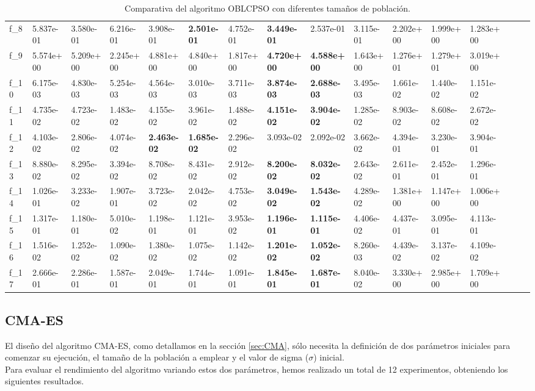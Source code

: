 \begin{table}[!ht]
{\begin{tabular}{LLLLLLLLLLLLLLLL}
f_{8} & 5.837e-01 & 3.580e-01 & 6.216e-01 & 3.908e-01 & {\bf 2.501e-01} & 4.752e-01 & {\bf 3.449e-01} & 2.537e-01 & 3.115e-01 & 2.202e+00 & 1.999e+00 & 1.283e+00 \\
f_{9} & 5.574e+00 & 5.209e+00 & 2.245e+00 & 4.881e+00 & 4.840e+00 & 1.817e+00 & {\bf 4.720e+00} & {\bf 4.588e+00} & 1.643e+00 & 1.276e+01 & 1.279e+01 & 3.019e+00 \\
f_{10} & 6.175e-03 & 4.830e-03 & 5.254e-03 & 4.564e-03 & 3.010e-03 & 3.711e-03 & {\bf 3.874e-03} & {\bf 2.688e-03} & 3.495e-03 & 1.661e-02 & 1.440e-02 & 1.151e-02 \\
f_{11} & 4.735e-02 & 4.723e-02 & 1.483e-02 & 4.155e-02 & 3.961e-02 & 1.488e-02 & {\bf 4.151e-02} & {\bf 3.904e-02} & 1.285e-02 & 8.903e-02 & 8.608e-02 & 2.672e-02 \\
f_{12} & 4.103e-02 & 2.806e-02 & 4.074e-02 & {\bf 2.463e-02} & {\bf 1.685e-02} & 2.296e-02 & 3.093e-02 & 2.092e-02 & 3.662e-02 & 4.394e-01 & 3.230e-01 & 3.904e-01 \\
f_{13} & 8.880e-02 & 8.295e-02 & 3.394e-02 & 8.708e-02 & 8.431e-02 & 2.912e-02 & {\bf 8.200e-02} & {\bf 8.032e-02} & 2.643e-02 & 2.611e-01 & 2.452e-01 & 1.296e-01 \\
f_{14} & 1.026e-01 & 3.233e-02 & 1.907e-01 & 3.723e-02 & 2.042e-02 & 4.753e-02 & {\bf 3.049e-02} & {\bf 1.543e-02} & 4.289e-02 & 1.381e+00 & 1.147e+00 & 1.006e+00 \\
f_{15} & 1.317e-01 & 1.180e-01 & 5.010e-02 & 1.198e-01 & 1.121e-01 & 3.953e-02 & {\bf 1.196e-01} & {\bf 1.115e-01} & 4.406e-02 & 4.437e-01 & 3.095e-01 & 4.113e-01 \\
f_{16} & 1.516e-02 & 1.252e-02 & 1.090e-02 & 1.380e-02 & 1.075e-02 & 1.142e-02 & {\bf 1.201e-02} & {\bf 1.052e-02} & 8.260e-03 & 4.439e-02 & 3.137e-02 & 4.109e-02 \\
f_{17} & 2.666e-01 & 2.286e-01 & 1.587e-01 & 2.049e-01 & 1.744e-01 & 1.091e-01 & {\bf 1.845e-01} & {\bf 1.687e-01} & 8.040e-02 & 3.330e+00 & 2.985e+00 & 1.709e+00 \\
    \bottomrule
    \end{tabular}}
    \captionsetup{justification=centering}
    \caption{Comparativa del algoritmo OBLCPSO con diferentes tamaños de población.}    
\end{table}
\newpage
\subsection{CMA-ES}\label{sec:paramCMA_ES}

El diseño del algoritmo CMA-ES, como detallamos en la sección \ref{sec:CMA}, sólo necesita la definición de dos parámetros iniciales para comenzar su ejecución, el tamaño de la población a emplear y el valor de sigma ($\sigma$) inicial. \\
Para evaluar el rendimiento del algoritmo variando estos dos parámetros, hemos realizado un total de 12 experimentos, obteniendo los siguientes resultados. \\


